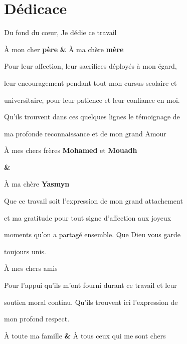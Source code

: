 \chapter*{Dédicace}

\begin{center}

  Du fond du cœur, Je dédie ce travail
  \par
  \vspace{3mm}
  À mon cher \textbf{père} \textbf{\&} À ma chère \textbf{mère}
  \par
  \vspace{3mm}
  Pour leur affection, leur sacrifices déployés à mon égard,
  \par
  \vspace{3mm}
  leur encouragement pendant tout mon cursus scolaire et
  \par
  \vspace{2mm}
  universitaire, pour leur patience et leur confiance en moi.
  \par
  \vspace{3mm}
  Qu'ils trouvent dans ces quelques lignes le témoignage de
  \par
  \vspace{2mm}
  ma profonde reconnaissance et de mon grand Amour
  \par
  \vspace{3mm}
  À mes chers frères \textbf{Mohamed} et \textbf{Mouadh}
  \par
  \vspace{3mm}
  \textbf{\&}
  \par
  \vspace{3mm}
  À ma chère \textbf{Yasmyn}
  \par
  \vspace{2mm}
  Que ce travail soit l'expression de mon grand attachement
  \par
  \vspace{2mm}
  et ma gratitude pour tout signe d'affection aux joyeux
  \par
  \vspace{2mm}
  moments qu'on a partagé ensemble. Que Dieu vous garde
  \par
  \vspace{2mm}
  toujours unis.
  \par
  \vspace{3mm}
  À mes chers amis
  \par
  \vspace{3mm}
  Pour l'appui qu'ils m'ont fourni durant ce travail et leur
  \par
  \vspace{2mm}
  soutien moral continu. Qu'ils trouvent ici l'expression de
  \par
  \vspace{2mm}
  mon profond respect.
  \par
  \vspace{3mm}
  À toute ma famille \textbf{\&} À tous ceux qui me sont chers

\end{center}
